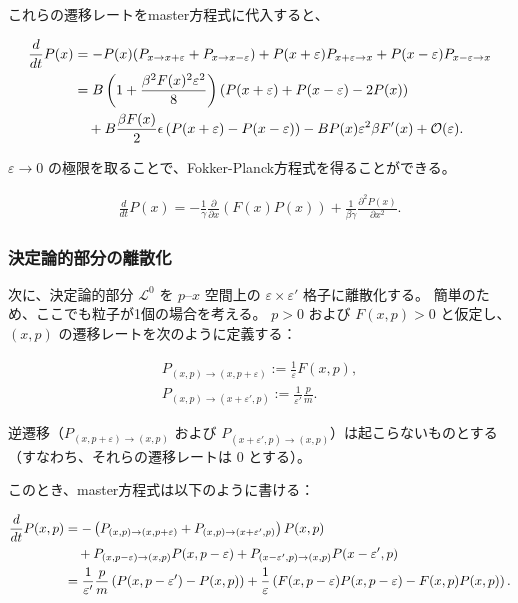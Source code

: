 \documentclass[a4paper,11pt]{jsarticle}
\numberwithin{equation}{section}
\begin{document}
これらの遷移レートをmaster方程式に代入すると、

\begin{align}
\frac{d}{dt} P(x)
&= -P(x)(P_{x \to x + \varepsilon} + P_{x \to x - \varepsilon})
+ P(x + \varepsilon) P_{x + \varepsilon \to x}
+ P(x - \varepsilon) P_{x - \varepsilon \to x} \notag \\
&= B \left( 1 + \frac{\beta^2 F(x)^2 \varepsilon^2}{8} \right)
\left( P(x + \varepsilon) + P(x - \varepsilon) - 2P(x) \right) \notag \\
&\quad + B \frac{\beta F(x)}{2}\epsilon \left( P(x + \varepsilon) - P(x - \varepsilon) \right)
- B P(x) \varepsilon^2 \beta F'(x) + \mathcal{O}(\varepsilon).
\end{align}

$\varepsilon \to 0$ の極限を取ることで、Fokker-Planck方程式を得ることができる。

\begin{align}
\frac{d}{dt} P(x)
= -\frac{1}{\gamma} \frac{\partial}{\partial x} \left(F(x) P(x)\right)
+ \frac{1}{\beta \gamma} \frac{\partial^2 P(x)}{\partial x^2}.
\end{align}
\subsubsection{決定論的部分の離散化}
次に、決定論的部分 $\mathcal{L}^0$ を $p$–$x$ 空間上の $\varepsilon \times \varepsilon'$ 格子に離散化する。
簡単のため、ここでも粒子が1個の場合を考える。
$p > 0$ および $F(x, p) > 0$ と仮定し、$(x, p)$ の遷移レートを次のように定義する：

\begin{align}
P_{(x, p) \to (x, p + \varepsilon)} := \frac{1}{\varepsilon} F(x, p), \\
P_{(x, p) \to (x + \varepsilon', p)} := \frac{1}{\varepsilon'} \frac{p}{m}.
\end{align}

逆遷移（$P_{(x, p + \varepsilon) \to (x, p)}$ および $P_{(x + \varepsilon', p) \to (x, p)}$）は起こらないものとする（すなわち、それらの遷移レートは 0 とする）。

このとき、master方程式は以下のように書ける：

\begin{align}
\frac{d}{dt} P(x, p)
&= -\left( P_{(x, p) \to (x, p + \varepsilon)} + P_{(x, p) \to (x + \varepsilon', p)} \right) P(x, p) \notag \\
&\quad + P_{(x, p - \varepsilon) \to (x, p)} P(x, p - \varepsilon)
+ P_{(x - \varepsilon', p) \to (x, p)} P(x - \varepsilon', p) \notag \\
&= \frac{1}{\varepsilon'} \frac{p}{m} \left( P(x, p - \varepsilon') - P(x, p) \right)
+ \frac{1}{\varepsilon} \left( F(x, p - \varepsilon) P(x, p - \varepsilon) - F(x, p) P(x, p) \right).
\end{align}
\end{document}
